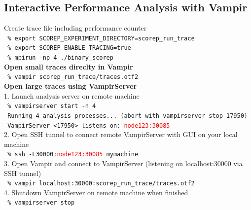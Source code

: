 \subsection{Interactive Performance Analysis with Vampir}
Create trace file including performance counter\\
\texttt{ \% export SCOREP\_EXPERIMENT\_DIRECTORY=scorep\_run\_trace}\\
\texttt{ \% export SCOREP\_ENABLE\_TRACING=true}\\
\texttt{ \% mpirun -np 4 ./binary\_scorep}\\[2ex]

\textbf{Open small traces direclty in Vampir}\\
\texttt{ \% vampir scorep\_run\_trace/traces.otf2}\\[2ex]

\textbf{Open large traces using VampirServer}\\
1. Launch analysis server on remote machine\\
\texttt{ \% vampirserver start -n 4 }\\
\texttt{ Running 4 analysis processes... (abort with vampirserver stop 17950)}\\
\texttt{ VampirServer <17950> listens on: \textcolor{red}{node123:30085}}\\[2ex]

2. Open SSH tunnel to connect remote VampirServer with GUI on your local machine\\
\texttt{ \% ssh -L30000:\textcolor{red}{node123:30085} mymachine}\\[2ex]

3. Open Vampir and connect to VampirServer (listening on localhost:30000 via SSH tunnel)\\
\texttt{ \% vampir localhost:30000:scorep\_run\_trace/traces.otf2}\\[2ex]

4. Shutdown VampirServer on remote machine when finished\\
\texttt{ \% vampirserver stop}



\vfill
\pagebreak

